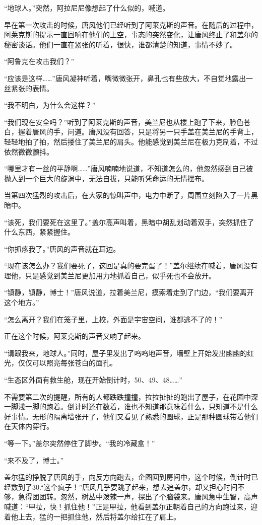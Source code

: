 “地球人。”突然，阿拉尼尼像想起了什么似的，喊道。

早在第一次攻击的时候，唐风他们已经听到了阿莱克斯的声音。在随后的过程中，阿莱克斯的提示一直回响在他们的上空，事态的突然变化，让唐风终止了和盖尔的秘密谈话。他们一直在紧张的听着，很快，谁都清楚的知道，事情不妙了。

“阿鲁克在攻击我们？”

“应该是这样……”唐风凝神听着，嘴微微张开，鼻孔也有些放大，不自觉地露出一丝紧张的表情。

“我不明白，为什么会这样？”

“我们现在安全吗？”听到了阿莱克斯的声音，美兰尼也从楼上跑了下来，脸色苍白，握着唐风的手，问道。唐风没有回答，只是将另一只手盖在美兰尼的手背上，轻轻地拍了拍，然后搂住了美兰尼的肩头。他能感觉到美兰尼在极力克制着，不过依然微微颤抖。

“哪里才有一丝的平静啊……”唐风喃喃地说道，不知道怎么的，他忽然感到自己被抛入到一个巨大的旋涡中，无法自拔，只能听凭命运的无情摆布。

当第四次猛烈的攻击后，在大家的惊叫声中，电力中断了，周围立刻陷入了一片黑暗中。

“该死，我们要死在这里了。”盖尔高声叫着，黑暗中胡乱划动着双手，突然抓住了什么东西，紧紧握住。

“你抓疼我了。”唐风的声音就在耳边。

“现在该怎么办？我们要死了，这回是真的要完蛋了！”盖尔继续在喊着，唐风没有理他，只是感觉到美兰尼更加用力地抓着自己，似乎死也不会放开。

“镇静，镇静，博士！”唐风说道，拉着美兰尼，摸索着走到了门边，“我们要离开这个地方。”

“怎么离开？我们在笼子里，上校，外面是宇宙空间，谁都逃不了的！”

正在这个时候，阿莱克斯的声音又响了起来。

“请跟我来，地球人。”同时，屋子里发出了呜呜地声音，墙壁上开始发出幽幽的红光，仅仅可以照亮每张苍白的面孔。

“生态区外面有救生舱，现在开始倒计时，50、49、48……”

不需要第二次的提醒，所有的人都跌跌撞撞，拉拉扯扯的跑出了屋子，在花园中深一脚浅一脚的跑着。倒计时还在数着，谁也不知道那意味着什么，只知道不是什么好事情。无形的隔离墙张开了，他们又看见了熟悉的圆球，正是那种圆球带着他们在天体内穿行。

“等一下。”盖尔突然停住了脚步。“我的冷藏盒！”

“来不及了，博士。”

盖尔猛的挣脱了唐风的手，向反方向跑去，企图回到房间中，这个时候，倒计时已经数到了30.“这个疯子！”唐风几乎要跳了起来，想去追盖尔，却又担心时间不够，急得团团转。忽然，树丛中泼辣一声，探出了个脑袋来。唐风急中生智，高声喊道：“甲拉，快！抓住他！”正是甲拉，他看到盖尔正朝着自己的方向跑过来，迎着他上去，猛的一把抓住他，然后将盖尔给扛在了肩上。

